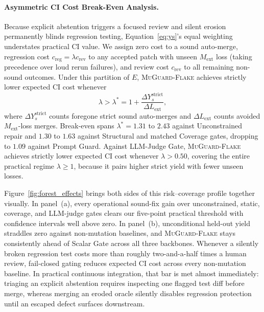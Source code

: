 \paragraph{Asymmetric CI Cost Break-Even Analysis.}
Because explicit abstention triggers a focused review and silent erosion permanently blinds regression testing, Equation~\ref{eq:ys}'s equal weighting understates practical CI value. We assign zero cost to a sound auto-merge, regression cost $c_{\text{reg}} = \lambda c_{\text{rev}}$ to any accepted patch with unseen $M_{\text{ext}}$ loss (taking precedence over loud rerun failures), and review cost $c_{\text{rev}}$ to all remaining non-sound outcomes. Under this partition of $E$, \textsc{MuGuard-Flake} achieves strictly lower expected CI cost whenever
\begin{equation}
\label{eq:breakeven}
\lambda > \lambda^* = 1 + \frac{\Delta Y_s^{\text{strict}}}{\Delta L_{\text{ext}}},
\end{equation}
where $\Delta Y_s^{\text{strict}}$ counts foregone strict sound auto-merges and $\Delta L_{\text{ext}}$ counts avoided $M_{\text{ext}}$-loss merges. Break-even spans $\lambda^* = 1.31$ to $2.43$ against Unconstrained repair and $1.30$ to $1.63$ against Structural and matched Coverage gates, dropping to $1.09$ against Prompt Guard. Against LLM-Judge Gate, \textsc{MuGuard-Flake} achieves strictly lower expected CI cost whenever $\lambda > 0.50$, covering the entire practical regime $\lambda \ge 1$, because it pairs higher strict yield with fewer unseen losses.



Figure~\ref{fig:forest_effects} brings both sides of this risk--coverage profile together visually. In panel~(a), every operational sound-fix gain over unconstrained, static, coverage, and LLM-judge gates clears our five-point practical threshold with confidence intervals well above zero. In panel~(b), unconditional held-out yield straddles zero against non-mutation baselines, and \textsc{MuGuard-Flake} stays consistently ahead of Scalar Gate across all three backbones. Whenever a silently broken regression test costs more than roughly two-and-a-half times a human review, fail-closed gating reduces expected CI cost across every non-mutation baseline. In practical continuous integration, that bar is met almost immediately: triaging an explicit abstention requires inspecting one flagged test diff before merge, whereas merging an eroded oracle silently disables regression protection until an escaped defect surfaces downstream.

